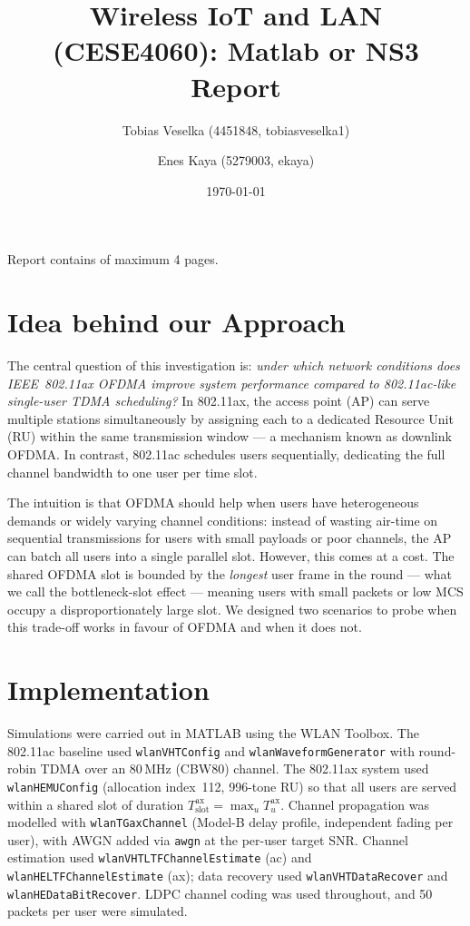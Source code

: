 \documentclass[twocolumn]{article}
\title{\large{\textbf{Wireless IoT and LAN (CESE4060): Matlab or NS3 Report}}}
\author{
    \small Tobias Veselka (4451848, tobiasveselka1) \and
    \small Enes Kaya (5279003, ekaya)
}
\date{\today}
\begin{document}
\maketitle

\begin{center}
    \footnotesize{Report contains \pageref{LastPage} of maximum 4 pages.}
\end{center}

\section{Idea behind our Approach}

The central question of this investigation is: \emph{under which network conditions does IEEE~802.11ax OFDMA improve system performance compared to 802.11ac-like single-user TDMA scheduling?} In 802.11ax, the access point (AP) can serve multiple stations simultaneously by assigning each to a dedicated Resource Unit (RU) within the same transmission window — a mechanism known as downlink OFDMA. In contrast, 802.11ac schedules users sequentially, dedicating the full channel bandwidth to one user per time slot.

The intuition is that OFDMA should help when users have heterogeneous demands or widely varying channel conditions: instead of wasting air-time on sequential transmissions for users with small payloads or poor channels, the AP can batch all users into a single parallel slot. However, this comes at a cost. The shared OFDMA slot is bounded by the \emph{longest} user frame in the round — what we call the bottleneck-slot effect — meaning users with small packets or low MCS occupy a disproportionately large slot. We designed two scenarios to probe when this trade-off works in favour of OFDMA and when it does not.

\section{Implementation}

Simulations were carried out in MATLAB using the WLAN Toolbox. The 802.11ac baseline used \texttt{wlanVHTConfig} and \texttt{wlanWaveformGenerator} with round-robin TDMA over an 80\,MHz (CBW80) channel. The 802.11ax system used \texttt{wlanHEMUConfig} (allocation index~112, 996-tone RU) so that all users are served within a shared slot of duration $T_\text{slot}^\text{ax} = \max_u T_u^\text{ax}$. Channel propagation was modelled with \texttt{wlanTGaxChannel} (Model-B delay profile, independent fading per user), with AWGN added via \texttt{awgn} at the per-user target SNR. Channel estimation used \texttt{wlanVHTLTFChannelEstimate} (ac) and \texttt{wlanHELTFChannelEstimate} (ax); data recovery used \texttt{wlanVHTDataRecover} and \texttt{wlanHEDataBitRecover}. LDPC channel coding was used throughout, and 50 packets per user were simulated.
\end{document}
